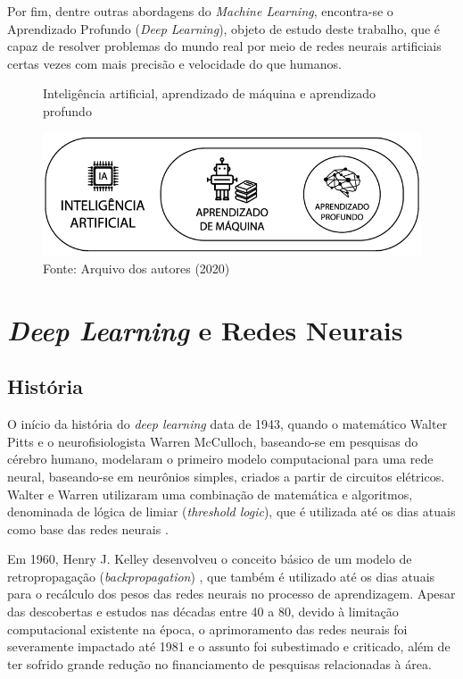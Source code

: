 \par Por fim, dentre outras abordagens do \textit{Machine Learning}, encontra-se o Aprendizado Profundo (\textit{Deep Learning}), objeto de estudo deste trabalho, que é capaz de resolver problemas do mundo real por meio de redes neurais artificiais certas vezes com mais precisão e velocidade do que humanos.

\begin{figure}[H]
    \centering
    \caption{Inteligência artificial, aprendizado de máquina e aprendizado profundo}
    \includegraphics[width=1.0\linewidth]{Imagens/deep.png}
    \caption*{Fonte: Arquivo dos autores (2020)}
    \label{autoai-results}
\end{figure}

\section{\textit{Deep Learning} e Redes Neurais}

\subsection{História}
\indent
\par O início da história do \textit{deep learning} data de 1943, quando o matemático Walter Pitts e o neurofisiologista Warren McCulloch, baseando-se em pesquisas do cérebro humano, modelaram o primeiro modelo computacional para uma rede neural, baseando-se em neurônios simples, criados a partir de circuitos elétricos. Walter e Warren utilizaram uma combinação de matemática e algoritmos, denominada de lógica de limiar (\textit{threshold logic}), que é utilizada até os dias atuais como base das redes neurais \cite{Academy2019}.

\par Em 1960, Henry J. Kelley desenvolveu o conceito básico de um modelo de retropropagação (\textit{backpropagation}) \cite{Foote2019}, que também é utilizado até os dias atuais para o recálculo dos pesos das redes neurais no processo de aprendizagem. Apesar das descobertas e estudos nas décadas entre 40 a 80, devido à limitação computacional existente na época, o aprimoramento das redes neurais foi severamente impactado até 1981 e o assunto foi subestimado e criticado, além de ter sofrido grande redução no financiamento de pesquisas relacionadas à área.

